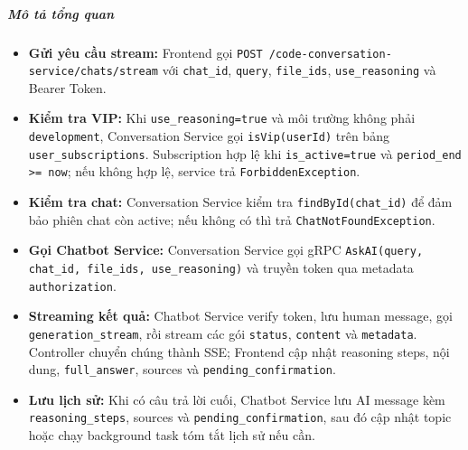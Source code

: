 \subparagraph{Mô tả tổng quan}
\begin{itemize}
\item \textbf{Gửi yêu cầu stream:} Frontend gọi \texttt{POST /code-conversation-service/chats/stream} với \texttt{chat\_id}, \texttt{query}, \texttt{file\_ids}, \texttt{use\_reasoning} và Bearer Token.
\item \textbf{Kiểm tra VIP:} Khi \texttt{use\_reasoning=true} và môi trường không phải \texttt{development}, Conversation Service gọi \texttt{isVip(userId)} trên bảng \texttt{user\_subscriptions}. Subscription hợp lệ khi \texttt{is\_active=true} và \texttt{period\_end >= now}; nếu không hợp lệ, service trả \texttt{ForbiddenException}.
\item \textbf{Kiểm tra chat:} Conversation Service kiểm tra \texttt{findById(chat\_id)} để đảm bảo phiên chat còn active; nếu không có thì trả \texttt{ChatNotFoundException}.
\item \textbf{Gọi Chatbot Service:} Conversation Service gọi gRPC \texttt{AskAI(query, chat\_id, file\_ids, use\_reasoning)} và truyền token qua metadata \texttt{authorization}.
\item \textbf{Streaming kết quả:} Chatbot Service verify token, lưu human message, gọi \texttt{generation\_stream}, rồi stream các gói \texttt{status}, \texttt{content} và \texttt{metadata}. Controller chuyển chúng thành SSE; Frontend cập nhật reasoning steps, nội dung, \texttt{full\_answer}, sources và \texttt{pending\_confirmation}.
\item \textbf{Lưu lịch sử:} Khi có câu trả lời cuối, Chatbot Service lưu AI message kèm \texttt{reasoning\_steps}, sources và \texttt{pending\_confirmation}, sau đó cập nhật topic hoặc chạy background task tóm tắt lịch sử nếu cần.
\end{itemize}
